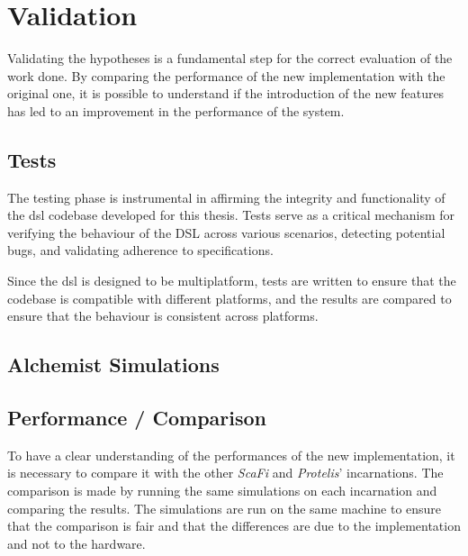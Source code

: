 
\chapter{Validation}
\label{ch:validation}
Validating the hypotheses is a fundamental step for the correct evaluation of the work done.
By comparing the performance of the new implementation with the original one, it is possible to understand if the
introduction of the new features has led to an improvement in the performance of the system.

\section{Tests}
\label{sec:tests}
The testing phase is instrumental in affirming the integrity and functionality of the \ac{dsl} codebase developed for this thesis.
Tests serve as a critical mechanism for verifying the behaviour of the DSL across various scenarios, detecting potential bugs,
and validating adherence to specifications.

Since the \ac{dsl} is designed to be multiplatform, tests are written to ensure that the codebase is compatible with
different platforms, and the results are compared to ensure that the behaviour is consistent across platforms.


\section{Alchemist Simulations}
\label{sec:alchemist-simulations}


\section{Performance / Comparison}
\label{sec:performance-/-comparison}
To have a clear understanding of the performances of the new implementation, it is necessary to compare it with the other
\emph{ScaFi} and \emph{Protelis}' incarnations.
The comparison is made by running the same simulations on each incarnation and comparing the results.
The simulations are run on the same machine to ensure that the comparison is fair and that the differences are due to the
implementation and not to the hardware.

